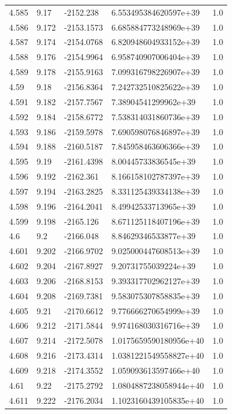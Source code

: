 \begin{tabular}{lllll}
4.585 & 9.17 & -2152.238 & 6.553495384620597e+39 & 1.0 \\
4.586 & 9.172 & -2153.1573 & 6.685884773248969e+39 & 1.0 \\
4.587 & 9.174 & -2154.0768 & 6.820948604933152e+39 & 1.0 \\
4.588 & 9.176 & -2154.9964 & 6.958740907006404e+39 & 1.0 \\
4.589 & 9.178 & -2155.9163 & 7.099316798226907e+39 & 1.0 \\
4.59 & 9.18 & -2156.8364 & 7.242732510825622e+39 & 1.0 \\
4.591 & 9.182 & -2157.7567 & 7.38904541299962e+39 & 1.0 \\
4.592 & 9.184 & -2158.6772 & 7.538314031860736e+39 & 1.0 \\
4.593 & 9.186 & -2159.5978 & 7.690598076846897e+39 & 1.0 \\
4.594 & 9.188 & -2160.5187 & 7.845958463606366e+39 & 1.0 \\
4.595 & 9.19 & -2161.4398 & 8.00445733836545e+39 & 1.0 \\
4.596 & 9.192 & -2162.361 & 8.166158102787397e+39 & 1.0 \\
4.597 & 9.194 & -2163.2825 & 8.331125439334138e+39 & 1.0 \\
4.598 & 9.196 & -2164.2041 & 8.49942533713965e+39 & 1.0 \\
4.599 & 9.198 & -2165.126 & 8.671125118407196e+39 & 1.0 \\
4.6 & 9.2 & -2166.048 & 8.84629346533877e+39 & 1.0 \\
4.601 & 9.202 & -2166.9702 & 9.025000447608513e+39 & 1.0 \\
4.602 & 9.204 & -2167.8927 & 9.20731755039224e+39 & 1.0 \\
4.603 & 9.206 & -2168.8153 & 9.393317702962127e+39 & 1.0 \\
4.604 & 9.208 & -2169.7381 & 9.583075307858835e+39 & 1.0 \\
4.605 & 9.21 & -2170.6612 & 9.776666270654999e+39 & 1.0 \\
4.606 & 9.212 & -2171.5844 & 9.974168030316716e+39 & 1.0 \\
4.607 & 9.214 & -2172.5078 & 1.0175659590180956e+40 & 1.0 \\
4.608 & 9.216 & -2173.4314 & 1.0381221549558827e+40 & 1.0 \\
4.609 & 9.218 & -2174.3552 & 1.059093613597466e+40 & 1.0 \\
4.61 & 9.22 & -2175.2792 & 1.0804887238058944e+40 & 1.0 \\
4.611 & 9.222 & -2176.2034 & 1.1023160439105835e+40 & 1.0 \\

\end{tabular}
